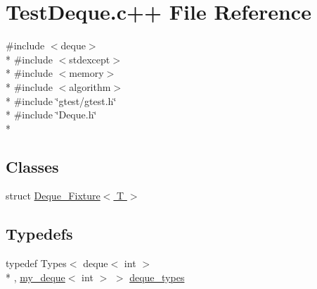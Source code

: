 \hypertarget{TestDeque_8c_09_09}{\section{Test\-Deque.\-c++ File Reference}
\label{TestDeque_8c_09_09}
}
{\ttfamily \#include $<$deque$>$}\\*
{\ttfamily \#include $<$stdexcept$>$}\\*
{\ttfamily \#include $<$memory$>$}\\*
{\ttfamily \#include $<$algorithm$>$}\\*
{\ttfamily \#include \char`\"{}gtest/gtest.\-h\char`\"{}}\\*
{\ttfamily \#include \char`\"{}Deque.\-h\char`\"{}}\\*
\subsection*{Classes}
\begin{DoxyCompactItemize}
\item 
struct \hyperlink{structDeque__Fixture}{Deque\-\_\-\-Fixture$<$ T $>$}
\end{DoxyCompactItemize}
\subsection*{Typedefs}
\begin{DoxyCompactItemize}
\item 
typedef Types$<$ deque$<$ int $>$\\*
, \hyperlink{classmy__deque}{my\-\_\-deque}$<$ int $>$ $>$ \hyperlink{TestDeque_8c_09_09_a44a3d805a5bc19d6bc402da26200d63d}{deque\-\_\-types}
\end{DoxyCompactItemize}
